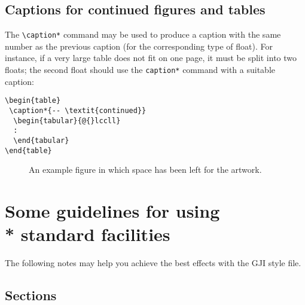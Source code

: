 \documentclass{gji}
\begin{document}
\subsection{Captions for continued figures and tables}

The \verb"\caption*" command may be used to produce a caption with the
same number as the previous caption (for the corresponding type of
float). For instance, if a very large table does not fit on one page,
it must be split into two floats; the second float should use the
\verb"caption*" command with a suitable caption:
\begin{verbatim}
\begin{table}
 \caption*{-- \textit{continued}}
  \begin{tabular}{@{}lccll}
  :
  \end{tabular}
\end{table}
\end{verbatim}

 \begin{figure}
     \vspace{5.5cm}
     \caption{An example figure in which space has been
              left for the artwork.}
     \label{sample-figure}
  \end{figure}

\section[]{Some guidelines for using\\* standard facilities}

The following notes may help you achieve the best effects with the GJI
style file.

\subsection{Sections}
\end{document}
